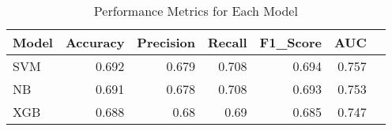 \begin{table}
\caption{Performance Metrics for Each Model}
\label{tab:performance_metrics}
\begin{tabular}{lrrrrrr}
\toprule
Model & Accuracy & Precision & Recall & F1\_Score & AUC \\
\midrule
SVM & 0.692 & 0.679 & 0.708 & 0.694 & 0.757 \\
NB & 0.691 & 0.678 & 0.708 & 0.693 & 0.753 \\
XGB & 0.688 & 0.68 & 0.69 & 0.685 & 0.747 \\
\bottomrule
\end{tabular}
\end{table}
